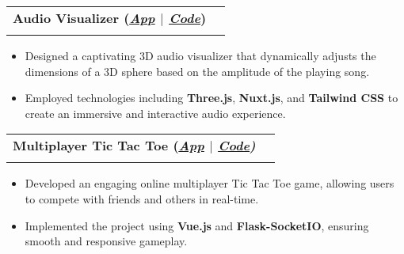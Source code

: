 \documentclass[a4paper,10pt]{article}
\makeatletter
\newcommand{\resumeSubheading}[4]{
  \vspace{-1pt}\item
    \begin{tabular*}{0.97\textwidth}[t]{l@{\extracolsep{\fill}}r}
      \textbf{#1} & #2 \\
      \textit{\normalsize#3} & \textit{\normalsize #4} \\
    \end{tabular*}\vspace{-7pt}
}
\makeatother
\begin{document}
\resumeSubheading
{Audio Visualizer (\textit{\href{https://audio-visualizer-threejs.netlify.app/}{\textbf{\underline{App}}} $|$ \href{https://github.com/AnkushSarkar10/audio_vis_threejs}{\textbf{\underline{Code}}}})}{}{}{}
\vspace{-15pt}
\begin{itemize}
  \item Designed a captivating 3D audio visualizer that dynamically adjusts the dimensions of a 3D sphere based on the amplitude of the playing song.
  \item Employed technologies including \textbf{Three.js}, \textbf{Nuxt.js}, and \textbf{Tailwind CSS} to create an immersive and interactive audio experience.
\end{itemize}
\vspace{-5pt}

\resumeSubheading
{Multiplayer Tic Tac Toe (\textit{\href{https://vue-flask-tic-tac-toe.web.app/}{\textbf{\underline{App}}} $|$ \href{https://github.com/AnkushSarkar10/vue-flask-tic-tac-toe}{\textbf{\underline{Code}}})}}{}{}{}
\vspace{-15pt}
\begin{itemize}
  \item Developed an engaging online multiplayer Tic Tac Toe game, allowing users to compete with friends and others in real-time.
  \item Implemented the project using \textbf{Vue.js} and \textbf{Flask-SocketIO}, ensuring smooth and responsive gameplay.
\end{itemize}
\vspace{-5pt}


\end{document}
